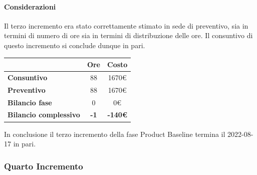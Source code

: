 \paragraph{Considerazioni} \hfill \break
Il terzo incremento era stato correttamente stimato in sede di preventivo, sia in termini di numero di ore sia 
in termini di distribuzione delle ore. Il consuntivo di questo incremento si conclude dunque in pari.
\begin{center}
	\renewcommand{\arraystretch}{1.8}
	\begin{tabular}{ | l |c|c| }
    \hline
    & \textbf{Ore} & \textbf{Costo} \\
	\hline
    \textbf{Consuntivo} & 88 & 1670\euro \\
    \hline
    \textbf{Preventivo} & 88 & 1670\euro \\
    \hline
    \textbf{Bilancio fase} & 0 & 0\euro \\
    \hline
    \textbf{Bilancio complessivo} & \textbf{-1} & \textbf{-140\euro} \\
    \hline
    \end{tabular}
\end{center}
In conclusione il terzo incremento della fase Product Baseline termina il 2022-08-17 in pari.
\newpage

\subsubsection{Quarto Incremento}

